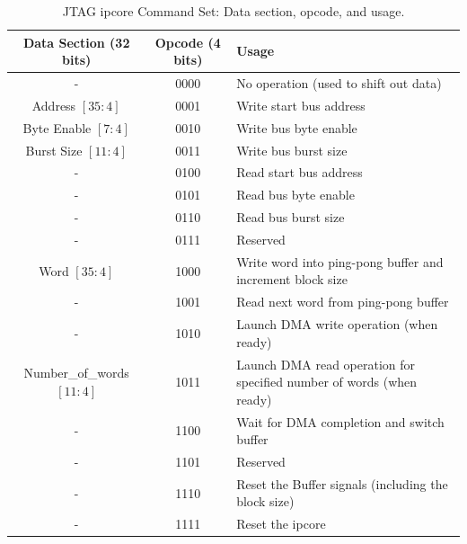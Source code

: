 \documentclass[a4paper,11pt,oneside]{report}
\begin{document}
\begin{table}[h!]
    \centering
    \begin{tabular}{|c|c|p{8cm}|}
        \hline
        \textbf{Data Section (32 bits)} & \textbf{Opcode (4 bits)} & \textbf{Usage} \\
        \hline
        -                               & 0000                     & No operation (used to shift out data) \\
        Address $[35:4]$                & 0001                     & Write start bus address \\
        Byte Enable $[7:4]$             & 0010                     & Write bus byte enable \\
        Burst Size $[11:4]$             & 0011                     & Write bus burst size \\
        -                               & 0100                     & Read start bus address \\
        -                               & 0101                     & Read bus byte enable \\
        -                               & 0110                     & Read bus burst size \\
        -                               & 0111                     & Reserved \\
        Word $[35:4]$                   & 1000                     & Write word into ping-pong buffer and increment block size \\
        -                               & 1001                     & Read next word from ping-pong buffer \\
        -                               & 1010                     & Launch DMA write operation (when ready) \\
        Number\_of\_words $[11:4]$      & 1011                     & Launch DMA read operation for specified number of words (when ready) \\
        -                               & 1100                     & Wait for DMA completion and switch buffer \\
        -                               & 1101                     & Reserved \\
        -                               & 1110                     & Reset the Buffer signals (including the block size) \\
        -                               & 1111                     & Reset the ipcore \\
        \hline
    \end{tabular}
    \caption{JTAG ipcore Command Set: Data section, opcode, and usage.}

\end{table}
\end{document}
